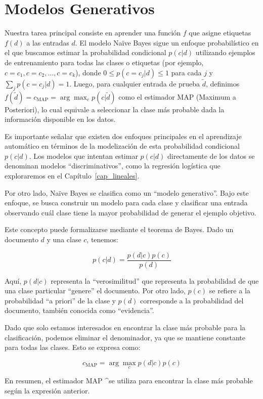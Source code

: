 \documentclass[11pt,fleqn]{book} %
\begin{document}
\section{Modelos Generativos}

Nuestra tarea principal consiste en aprender una función $f$ que asigne etiquetas $f(d)$ a las entradas $d$. El modelo Naïve Bayes sigue un enfoque probabilístico en el que buscamos estimar la probabilidad condicional $p(c|d)$ utilizando ejemplos de entrenamiento para todas las clases o etiquetas (por ejemplo, $c=c_1, c=c_2, \ldots, c=c_k$), donde $0 \leq p(c=c_j|d) \leq 1$ para cada $j$ y $\sum_j p(c=c_j|d)=1$. Luego, para cualquier entrada de prueba $\tilde{d}$, definimos $f(\tilde{d}) = c_{\text{MAP}} = \arg \max_c p(c|\tilde{d})$ como el estimador MAP (Maximum a Posteriori), lo cual equivale a seleccionar la clase más probable dada la información disponible en los datos.

Es importante señalar que existen dos enfoques principales en el aprendizaje automático en términos de la modelización de esta probabilidad condicional $p(c|d)$. Los modelos que intentan estimar $p(c|d)$ directamente de los datos se denominan modelos ``discriminativos'', como la regresión logística que exploraremos en el Capítulo~\ref{cap_lineales}.

Por otro lado, Naïve Bayes se clasifica como un ``modelo generativo''. Bajo este enfoque, se busca construir un modelo para cada clase y clasificar una entrada observando cuál clase tiene la mayor probabilidad de generar el ejemplo objetivo.

Este concepto puede formalizarse mediante el teorema de Bayes. Dado un documento $d$ y una clase $c$, tenemos:

\[
p(c | d) = \frac{p(d | c)p(c)}{p(d)}
\]

Aquí, $p(d | c)$ representa la ``verosimilitud'' que representa la probabilidad de que una clase particular ``genere'' el documento. Por otro lado, $p(c)$ se refiere a la probabilidad ``a priori'' de la clase y $p(d)$ corresponde a la probabilidad del documento, también conocida como ``evidencia''.

Dado que solo estamos interesados en encontrar la clase más probable para la clasificación, podemos eliminar el denominador, ya que se mantiene constante para todas las clases. Esto se expresa como:

\[
c_{\text{MAP}}  = \arg\max_{c} p(d | c)p(c)
\]

En resumen, el estimador MAP ^se utiliza para encontrar la clase más probable según la expresión anterior.
\end{document}
